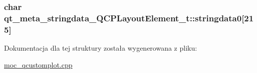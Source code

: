 \subsubsection[{\texorpdfstring{stringdata0}{stringdata0}}]{\setlength{\rightskip}{0pt plus 5cm}char qt\+\_\+meta\+\_\+stringdata\+\_\+\+Q\+C\+P\+Layout\+Element\+\_\+t\+::stringdata0\mbox{[}215\mbox{]}}\hypertarget{structqt__meta__stringdata___q_c_p_layout_element__t_a52a85794683573e29541c60c3cd4eefb}{}\label{structqt__meta__stringdata___q_c_p_layout_element__t_a52a85794683573e29541c60c3cd4eefb}


Dokumentacja dla tej struktury została wygenerowana z pliku\+:\begin{DoxyCompactItemize}
\item 
\hyperlink{moc__qcustomplot_8cpp}{moc\+\_\+qcustomplot.\+cpp}\end{DoxyCompactItemize}
